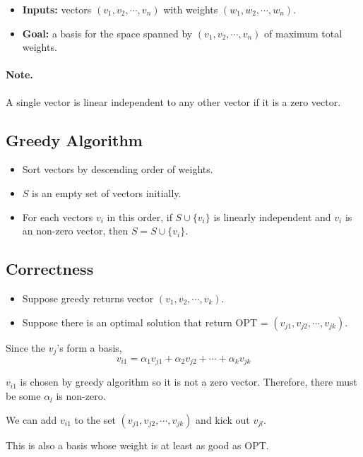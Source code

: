 \begin{itemize}
	\item \textbf{Inputs:} vectors $(v_1, v_2, \cdots, v_n)$ with weights 
$(w_1, w_2, \cdots, w_n)$.
    \item \textbf{Goal:} a basis for the space spanned by $(v_1, v_2, \cdots, 
v_n)$ of maximum total weights.
\end{itemize}
\paragraph{Note.} A single vector is linear independent to any other vector if 
it is a zero vector.

\subsection{Greedy Algorithm}
\begin{itemize}
	\item Sort vectors by descending order of weights.
	\item $S$ is an empty set of vectors initially.
	\item For each vectors $v_i$ in this order, if $S \cup \{v_i\}$ is linearly 
independent and $v_i$ is an non-zero vector, then $S = S \cup \{v_i\}$.
\end{itemize}

\subsection{Correctness}
\begin{itemize}
	\item Suppose greedy returns vector $(v_1, v_2, \cdots, v_k)$.
	\item Suppose there is an optimal solution that return OPT = $(v_{j1}, 
v_{j2}, \cdots, v_{jk})     $.
\end{itemize}

Since the $v_j$'s form a basis,
\[v_{i1} = \alpha_1 v_{j1} + \alpha_2 v_{j2} + \cdots + \alpha_k v_{jk}\]

$v_{i1}$ is chosen by greedy algorithm so it is not a zero vector. Therefore, 
there must be some $\alpha_l$ is non-zero.

We can add $v_{i1}$ to the set $(v_{j1}, v_{j2}, \cdots, v_{jk})$ and kick out 
$v_{jl}$.

\begin{claim}{}
	This is also a basis whose weight is at least as good as OPT.
\end{claim}
